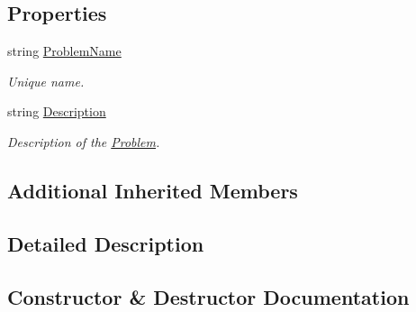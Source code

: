 \subsection*{Properties}
\begin{DoxyCompactItemize}
\item 
string \mbox{\hyperlink{class_code_a_friend_1_1_data_model_1_1_user_1_1_update_problem_command_a77c694466691a4fc02c1f56a017219fa}{Problem\+Name}}
\begin{DoxyCompactList}\small\item\em Unique name.\end{DoxyCompactList}\item 
string \mbox{\hyperlink{class_code_a_friend_1_1_data_model_1_1_user_1_1_update_problem_command_a542cc19f5586f32a7b6539d41a091c3b}{Description}}
\begin{DoxyCompactList}\small\item\em Description of the \mbox{\hyperlink{class_code_a_friend_1_1_data_model_1_1_problem}{Problem}}.\end{DoxyCompactList}\end{DoxyCompactItemize}
\subsection*{Additional Inherited Members}


\subsection{Detailed Description}


\subsection{Constructor \& Destructor Documentation}
\mbox{\label{class_code_a_friend_1_1_data_model_1_1_user_1_1_update_problem_command_ab479f2e60c03c69f054422fba29c4879}} 
